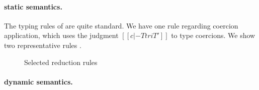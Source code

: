 



\paragraph{\tnamee static semantics.}

The typing rules of \tnamee are quite standard. We have one rule  regarding
coercion application, which uses the judgment $[[ c |- T tri T' ]]$ to
type coercions. We show two representative rules .
{\small
}%


\begin{figure}[t]
  \centering
  \caption{Selected reduction rules}
  \label{fig:red:fi}
\end{figure}

\paragraph{\tnamee dynamic semantics.}

